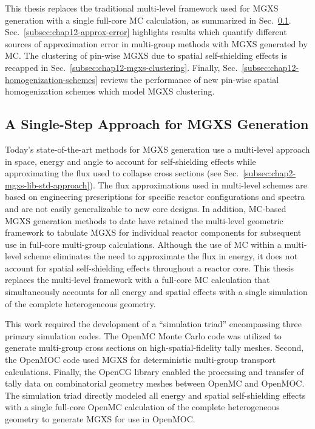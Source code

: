 This thesis replaces the traditional multi-level framework used for \ac{MGXS} generation with a single full-core MC calculation, as summarized in Sec.~\ref{subsec:chap12-single-step}. Sec.~\ref{subsec:chap12-approx-error} highlights results which quantify different sources of approximation error in multi-group methods with \ac{MGXS} generated by \ac{MC}. The clustering of pin-wise \ac{MGXS} due to spatial self-shielding effects is recapped in Sec.~\ref{subsec:chap12-mgxs-clustering}. Finally, Sec.~\ref{subsec:chap12-homogenization-schemes} reviews the performance of new pin-wise spatial homogenization schemes which model \ac{MGXS} clustering.

\subsection{A Single-Step Approach for MGXS Generation}
\label{subsec:chap12-single-step}

Today's state-of-the-art methods for \ac{MGXS} generation use a multi-level approach in space, energy and angle to account for self-shielding effects while approximating the flux used to collapse cross sections (see Sec.~\ref{subsec:chap2-mgxs-lib-std-approach}). The flux approximations used in multi-level schemes are based on engineering prescriptions for specific reactor configurations and spectra and are not easily generalizable to new core designs. In addition, \ac{MC}-based \ac{MGXS} generation methods to date have retained the multi-level geometric framework to tabulate MGXS for individual reactor components for subsequent use in full-core multi-group calculations. Although the use of MC within a multi-level scheme eliminates the need to approximate the flux in energy, it does not account for spatial self-shielding effects throughout a reactor core. This thesis replaces the multi-level framework with a full-core \ac{MC} calculation that simultaneously accounts for all energy and spatial effects with a single simulation of the complete heterogeneous geometry.

This work required the development of a ``simulation triad'' encompassing three primary simulation codes. The OpenMC Monte Carlo code was utilized to generate multi-group cross sections on high-spatial-fidelity tally meshes. Second, the OpenMOC code used \ac{MGXS} for deterministic multi-group transport calculations. Finally, the OpenCG library enabled the processing and transfer of tally data on combinatorial geometry meshes between OpenMC and OpenMOC. The simulation triad directly modeled all energy and spatial self-shielding effects with a single full-core OpenMC calculation of the complete heterogeneous geometry to generate \ac{MGXS} for use in OpenMOC.

